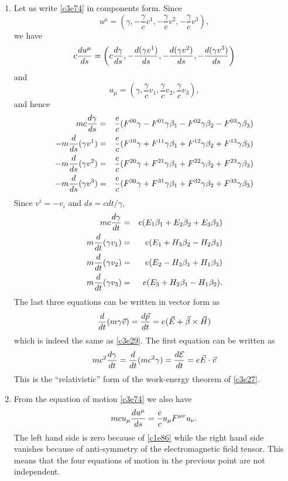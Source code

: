 \begin{enumerate}
\item Let us write \eqref{c3e74} in components form. Since
\[
u^\mu = 
\left(\gamma, -\frac{\gamma}{c}v^1, -\frac{\gamma}{c}v^2, 
-\frac{\gamma}{c}v^3\right),
\]
we have
\[
c\frac{d{u^\mu}}{d{s}} = \left(c\frac{d{\gamma}}{d{s}}, -\frac{d{(\gamma v^1)}}{d{s}}, 
-\frac{d{(\gamma v^2)}}{d{s}}, -\frac{d{(\gamma v^3)}}{d{s}}\right)
\]
and
\[
u_\mu = \left(\gamma, \frac{\gamma}{c}v_1, \frac{\gamma}{c}v_2, 
\frac{\gamma}{c}v_3\right),
\]
and hence
\begin{eqnarray*}
mc\frac{d{\gamma}}{d{s}} &=& \frac{e}{c}(F^{00}\gamma - F^{01}\gamma \beta_1 - 
F^{02}\gamma \beta_2 -F^{03}\gamma \beta_3) \\
-m\frac{d}{ds}(\gamma v^1)&=&\frac{e}{c}(F^{10}\gamma + F^{11}\gamma \beta_1 +
F^{12}\gamma \beta_2 + F^{13}\gamma \beta_3) \\
-m\frac{d}{ds}(\gamma v^2)&=&\frac{e}{c}(F^{20}\gamma + F^{21}\gamma \beta_1 + 
F^{22}\gamma \beta_2 + F^{23}\gamma \beta_3) \\
-m\frac{d}{ds}(\gamma v^3)&=&\frac{e}{c}(F^{30}\gamma + F^{31}\gamma \beta_1 + 
F^{32}\gamma \beta_2 + F^{33}\gamma \beta_3) 
\end{eqnarray*}
Since $v^i = -v_i$ and $ds = cdt/\gamma$,
\begin{eqnarray*}
mc\frac{d{\gamma}}{d{t}} &=& e(E_1 \beta_1 + E_2 \beta_2 + E_3 \beta_3) \\
m\frac{d}{dt}(\gamma v_1) &=& e(E_1 + H_3 \beta_2 - H_2 \beta_3) \\
m\frac{d}{dt}(\gamma v_2) &=& e(E_2 - H_3 \beta_1 + H_1 \beta_3) \\
m\frac{d}{dt}(\gamma v_3) &=& e(E_3 + H_2 \beta_1 - H_1 \beta_2).
\end{eqnarray*}
The last three equations can be written in vector form as
\[
\frac{d}{dt}(m\gamma\vec{v}) = \frac{d{\vec{p}}}{d{t}} = 
e(\vec{E} + \vec{\beta} \times \vec{H})
\]
which is indeed the same as \eqref{c3e29}. The first equation can be written as
\[
mc^2\frac{d{\gamma}}{d{t}} = \frac{d}{dt}(mc^2\gamma) = 
\frac{d{\mathcal{E}}}{d{t}} = e\vec{E}\cdot\vec{v}
\]
This is the ``relativistic'' form of the work-energy theorem of \eqref{c3e27}.

\item From the equation of motion \eqref{c3e74} we also have
\[
mcu_\mu\frac{d{u^\mu}}{d{s}} = \frac{e}{c}u_\mu F^{\mu\nu}u_\nu.
\]
The left hand side is zero because of \eqref{c1e86} while the right hand side 
vanishes because of anti-symmetry of the electromagnetic field tensor. This 
means that the four equations of motion in the previous point are not 
independent.


\end{enumerate}
